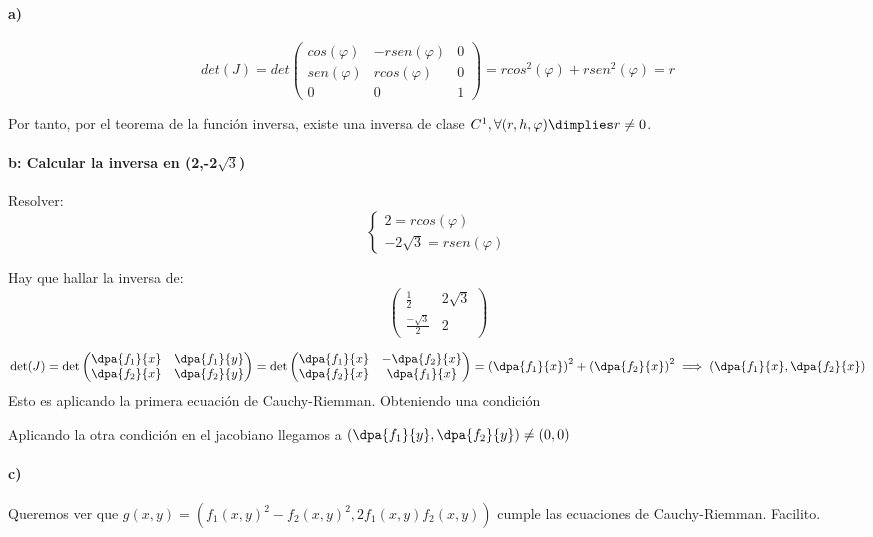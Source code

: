 \begin{problem}[8]
\solution
\paragraph{a)}

$$det(J) = det\begin{pmatrix}
       cos(\varphi)&-rsen(\varphi)&0\\
       sen(\varphi)&rcos(\varphi)&0\\
       0&0&1
      \end{pmatrix} = rcos^2(\varphi) + rsen^2(\varphi) = r$$
      
      Por tanto, por el teorema de la función inversa, existe una inversa de clase $C^1, \forall (r,h,\varphi) \dimplies r\neq 0$.
\end{problem}
 \begin{problem}[9]
 \solution
 \paragraph{b: Calcular la inversa en (2,-2$\sqrt{3}$)}
 
 Resolver: $$\left\{\begin{matrix} 2 = rcos(\varphi)\\-2\sqrt{3} = rsen(\varphi)\end{matrix}\right.$$
 
 Hay que hallar la inversa de: $$\begin{pmatrix}
                                  \frac{1}{2}&2\sqrt{3}\\
                                  \frac{-\sqrt{3}}{2}&2
                                 \end{pmatrix}$$

    \end{problem}                             
  \begin{problem}[13]
  \solution
  
  $$\det(J) = \det \begin{pmatrix}
              \dpa{f_1}{x}&\dpa{f_1}{y}\\
              \dpa{f_2}{x}&\dpa{f_2}{y}
             \end{pmatrix} = 
             \det \begin{pmatrix}
              \dpa{f_1}{x}&-\dpa{f_2}{x}\\
              \dpa{f_2}{x}& \dpa{f_1}{x}
             \end{pmatrix}
      = \left(\dpa{f_1}{x}\right)^2 + \left(\dpa{f_2}{x}\right)^2 \implies \left(\dpa{f_1}{x},\dpa{f_2}{x}\right)$$
Esto es aplicando la primera ecuación de Cauchy-Riemman. Obteniendo una condición

Aplicando la otra condición en el jacobiano llegamos a $\displaystyle\left(\dpa{f_1}{y},\dpa{f_2}{y}\right)\neq (0,0)$
\paragraph{c)}

Queremos ver que $g(x,y) = (f_1(x,y)^2-f_2(x,y)^2,2f_1(x,y)f_2(x,y))$ cumple las ecuaciones de Cauchy-Riemman. Facilito.
\end{problem}


